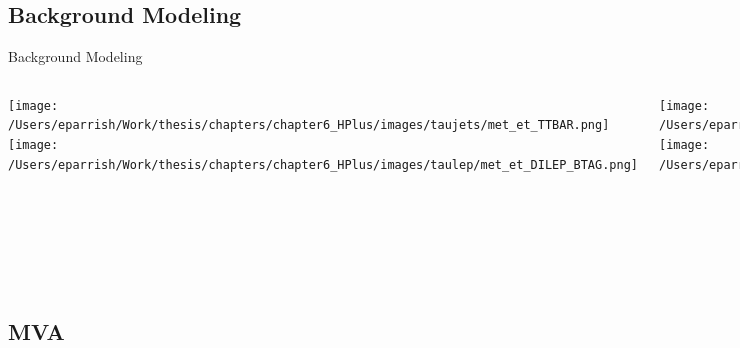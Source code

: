 \documentclass[aspectratio=169,xcolor=table]{beamer}
\begin{document}
  \subsection{ Background Modeling }
    \begin{frame}[t]{Background Modeling}
        \begin{columns}[t]

        \texttt{[image: /Users/eparrish/Work/thesis/chapters/chapter6\_HPlus/images/taujets/met\_et\_TTBAR.png]}
        \texttt{[image: /Users/eparrish/Work/thesis/chapters/chapter6\_HPlus/images/taulep/met\_et\_DILEP\_BTAG.png]}

        \texttt{[image: /Users/eparrish/Work/thesis/chapters/chapter6\_HPlus/images/taujets/met\_et\_BVETO\_MT100.png]}
        \texttt{[image: /Users/eparrish/Work/thesis/chapters/chapter6\_HPlus/images/taulep/met\_et\_SS\_TAUEL.png]}

          \vspace{-.45\textheight}
          \begin{itemize}
            \item \Etm distributions in control regions
            \item Simulation agrees with data within errors
          \end{itemize}
          \vspace{.2\textheight}
          \begin{columns}
              \hfill
              \texttt{[image: /Users/eparrish/Work/thesis/chapters/chapter6\_HPlus/images/taulep/met\_et\_SS\_TAUMU.png]}
              \hfill
              \texttt{[image: /Users/eparrish/Work/thesis/chapters/chapter6\_HPlus/images/taulep/met\_et\_ZEE.png]}
          \end{columns}

      \end{columns}
    \end{frame}

  \subsection{ MVA }
\end{document}
